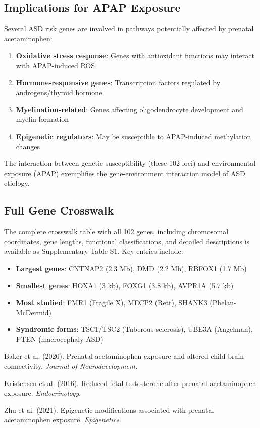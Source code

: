 \documentclass[12pt]{article}
\begin{document}
\subsection{Implications for APAP Exposure}
Several ASD risk genes are involved in pathways potentially affected by prenatal acetaminophen:
\begin{enumerate}
\item \textbf{Oxidative stress response}: Genes with antioxidant functions may interact with APAP-induced ROS
\item \textbf{Hormone-responsive genes}: Transcription factors regulated by androgens/thyroid hormone
\item \textbf{Myelination-related}: Genes affecting oligodendrocyte development and myelin formation
\item \textbf{Epigenetic regulators}: May be susceptible to APAP-induced methylation changes
\end{enumerate}

The interaction between genetic susceptibility (these 102 loci) and environmental exposure (APAP) exemplifies the gene-environment interaction model of ASD etiology.

\subsection{Full Gene Crosswalk}
The complete crosswalk table with all 102 genes, including chromosomal coordinates, gene lengths, functional classifications, and detailed descriptions is available as Supplementary Table S1. Key entries include:

\begin{itemize}
\item \textbf{Largest genes}: CNTNAP2 (2.3 Mb), DMD (2.2 Mb), RBFOX1 (1.7 Mb)
\item \textbf{Smallest genes}: HOXA1 (3 kb), FOXG1 (3.8 kb), AVPR1A (5.7 kb)
\item \textbf{Most studied}: FMR1 (Fragile X), MECP2 (Rett), SHANK3 (Phelan-McDermid)
\item \textbf{Syndromic forms}: TSC1/TSC2 (Tuberous sclerosis), UBE3A (Angelman), PTEN (macrocephaly-ASD)
\end{itemize}


\begin{thebibliography}{3}
Baker et al. (2020). Prenatal acetaminophen exposure and altered child brain connectivity. \textit{Journal of Neurodevelopment}.

Kristensen et al. (2016). Reduced fetal testosterone after prenatal acetaminophen exposure. \textit{Endocrinology}.

Zhu et al. (2021). Epigenetic modifications associated with prenatal acetaminophen exposure. \textit{Epigenetics}.
\end{thebibliography}
\end{document}
